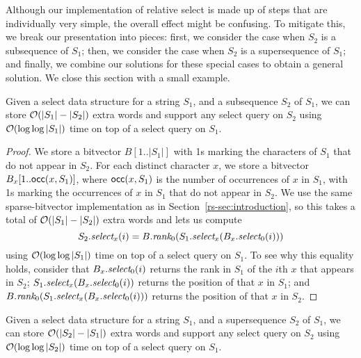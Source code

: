 Although our implementation of relative select is made up of steps that are individually very simple, the overall effect might be confusing.  To mitigate this, we break our presentation into pieces: first, we consider the case when $S_2$ is a subsequence of $S_1$; then, we consider the case when $S_2$ is a supersequence of $S_1$; and finally, we combine our solutions for these special cases to obtain a general solution.  We close this section with a small example.

\begin{lemma}
\label{rs-lem:subsequence}
Given a select data structure for a string $S_1$, and a subsequence $S_2$ of $S_1$, we can store $\mathcal{O}\!\left( |S_1| - |S_2| \right)$ extra words and support any select query on $S_2$ using $\mathcal{O}\!\left( \log \log |S_1| \right)$ time on top of a select query on $S_1$.
\end{lemma}

\begin{proof}
We store a bitvector \(B [1..|S_1|]\) with 1s marking the characters of $S_1$ that do not appear in $S_2$.  For each distinct character $x$, we store a bitvector \(B_x [1..\mathsf{occ} (x, S_1)]\), where \(\mathsf{occ} (x, S_1)\) is the number of occurrences of $x$ in $S_1$, with 1s marking the occurrences of $x$ in $S_1$ that do not appear in $S_2$.  We use the same sparse-bitvector implementation as in Section~\ref{rs-sec:introduction}, so this takes a total of $\mathcal{O}\!\left( |S_1| - |S_2| \right)$ extra words and lets us compute
\[S_2.\textit{select}_x (i) = B.\textit{rank}_0 (S_1.\textit{select}_x (B_x.\textit{select}_0 (i)))\]
using $\mathcal{O}\!\left( \log \log |S_1| \right)$ time on top of a select query on $S_1$.  To see why this equality holds, consider that \(B_x.\textit{select}_0 (i)\) returns the rank in $S_1$ of the $i$th $x$ that appears in $S_2$; \(S_1.\textit{select}_x (B_x.\textit{select}_0 (i))\) returns the position of that $x$ in $S_1$; and \(B.\textit{rank}_0 (S_1.\textit{select}_x (B_x.\textit{select}_0 (i)))\) returns the position of that $x$ in $S_2$.
\end{proof}

\begin{lemma}
\label{rs-lem:supersequence}
Given a select data structure for a string $S_1$, and a supersequence $S_2$ of $S_1$, we can store $\mathcal{O}\!\left( |S_2| - |S_1| \right)$ extra words and support any select query on $S_2$ using $\mathcal{O}\!\left( \log \log |S_2| \right)$ time on top of a select query on $S_1$.
\end{lemma}

